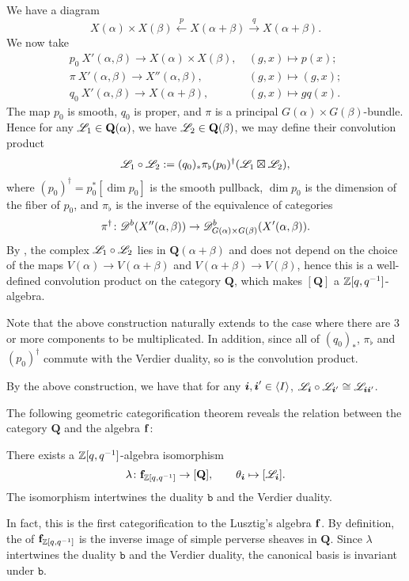 We have a diagram 
\[
    X(\alpha)\times X(\beta)\xleftarrow{p}
    X(\alpha+\beta)\xrightarrow{q}X(\alpha+\beta).
\]
We now take 
\[
    \begin{aligned}
        p_0\:X'(\alpha,\beta)\to X(\alpha)\times X(\beta),&\ (g,x)\mapsto p(x);\\
        \pi\:X'(\alpha,\beta)\to X''(\alpha,\beta),&\ (g,x)\mapsto (g,x);\\
        q_0\:X'(\alpha,\beta)\to X(\alpha+\beta),&\ (g,x)\mapsto gq(x).
    \end{aligned}
\]
The map $p_0$ is smooth, $q_0$ is proper, and $\pi$ is a principal
$G(\alpha)\times G(\beta)$-bundle. Hence for any $\mathscr{L}_1\in\mathbf{Q}(\alpha)$, we have
$\mathscr{L}_2\in\mathbf{Q}(\beta)$, we may define their convolution product
\[
    \mathscr{L}_1\circ\mathscr{L}_2 := (q_0)_*\pi_\flat(p_0)^\dagger(\mathscr{L}_1\boxtimes\mathscr{L}_2),
\]
where $(p_0)^\dagger = p_0^*[\dim p_0]$ is the smooth pullback,
$\dim p_0$ is the dimension of the fiber of $p_0$,
and $\pi_\flat$ is the inverse of the equivalence of categories
\[
    \pi^\dagger\colon\mathscr{D}^b(X''(\alpha,\beta))\to\mathscr{D}^b_{G(\alpha)\times G(\beta)}
    (X'(\alpha,\beta)).
\]
By \cite[Lemma 9.2.3]{L}, the complex $\mathscr{L}_1\circ\mathscr{L}_2$
lies in $\mathbf{Q}(\alpha+\beta)$ and does not depend on the choice of
the maps $V(\alpha)\to V(\alpha+\beta)$ and $V(\alpha+\beta)\to V(\beta)$, 
hence this is a well-defined
convolution product on the category $\mathbf{Q}$, which makes 
$[\mathbf{Q}]$ a $\mathbb{Z}[q,q^{-1}]$-algebra.

Note that the above construction naturally extends to the case where
there are 3 or more components to be multiplicated. In addition,
since all of $(q_0)_*$, $\pi_\flat$ and $(p_0)^\dagger$ commute
with the Verdier duality, so is the convolution product.

By the above construction, we have that for any $\boldsymbol{i},\boldsymbol{i}'\in\left<I\right>$,
$\mathscr{L}_{\boldsymbol{i}}\circ\mathscr{L}_{\boldsymbol{i}'}\cong\mathscr{L}_{\boldsymbol{i}\boldsymbol{i}'}$.

The following geometric categorification theorem reveals the relation
 between the category $\mathbf{Q}$
and the algebra $\mathbf{f}$:

\begin{theorem}[{\cite[Theorem 13.2.11]{L}}]\label{f-and-q}
    There exists a $\mathbb{Z}[q,q^{-1}]$-algebra isomorphism
    \[
        \lambda\colon\mathbf{f}_{\mathbb{Z}[q,q^{-1}]}\to[\mathbf{Q}],\qquad
        \theta_{\boldsymbol{i}}\mapsto[\mathscr{L}_{\boldsymbol{i}}].
    \]     
    The isomorphism
    intertwines the duality $\mathtt{b}$ and the Verdier duality.
\end{theorem}

In fact, this is the first categorification to the Lusztig's algebra $\mathbf{f}$.
By definition, the 
of $\mathbf{f}_{\mathbb{Z}[q,q^{-1}]}$ is the inverse image of simple perverse sheaves
in $\mathbf{Q}$. Since $\lambda$ intertwines the duality $\mathtt{b}$ and the Verdier duality,
the canonical basis is invariant under $\mathtt{b}$.

